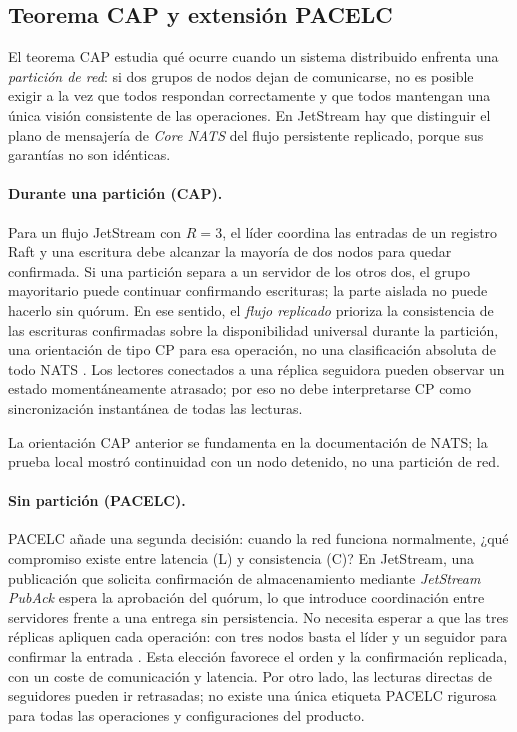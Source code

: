 \documentclass[12pt,a4paper]{article}
\begin{document}
\subsection{Teorema CAP y extensión PACELC}
El teorema CAP estudia qué ocurre cuando un sistema distribuido enfrenta una \emph{partición de red}: si dos grupos de nodos dejan de comunicarse, no es posible exigir a la vez que todos respondan correctamente y que todos mantengan una única visión consistente de las operaciones. En JetStream hay que distinguir el plano de mensajería de \emph{Core NATS} del flujo persistente replicado, porque sus garantías no son idénticas.

\paragraph{Durante una partición (CAP).}
Para un flujo JetStream con \(R=3\), el líder coordina las entradas de un registro Raft y una escritura debe alcanzar la mayoría de dos nodos para quedar confirmada. Si una partición separa a un servidor de los otros dos, el grupo mayoritario puede continuar confirmando escrituras; la parte aislada no puede hacerlo sin quórum. En ese sentido, el \emph{flujo replicado} prioriza la consistencia de las escrituras confirmadas sobre la disponibilidad universal durante la partición, una orientación de tipo CP para esa operación, no una clasificación absoluta de todo NATS \cite{natsreplication}. Los lectores conectados a una réplica seguidora pueden observar un estado momentáneamente atrasado; por eso no debe interpretarse CP como sincronización instantánea de todas las lecturas.

La orientación CAP anterior se fundamenta en la documentación de NATS; la prueba local mostró continuidad con un nodo detenido, no una partición de red.

\paragraph{Sin partición (PACELC).}
PACELC añade una segunda decisión: cuando la red funciona normalmente, ¿qué compromiso existe entre latencia (L) y consistencia (C)? En JetStream, una publicación que solicita confirmación de almacenamiento mediante \emph{JetStream PubAck} espera la aprobación del quórum, lo que introduce coordinación entre servidores frente a una entrega sin persistencia. No necesita esperar a que las tres réplicas apliquen cada operación: con tres nodos basta el líder y un seguidor para confirmar la entrada \cite{natsreplication}. Esta elección favorece el orden y la confirmación replicada, con un coste de comunicación y latencia. Por otro lado, las lecturas directas de seguidores pueden ir retrasadas; no existe una única etiqueta PACELC rigurosa para todas las operaciones y configuraciones del producto.
\end{document}
